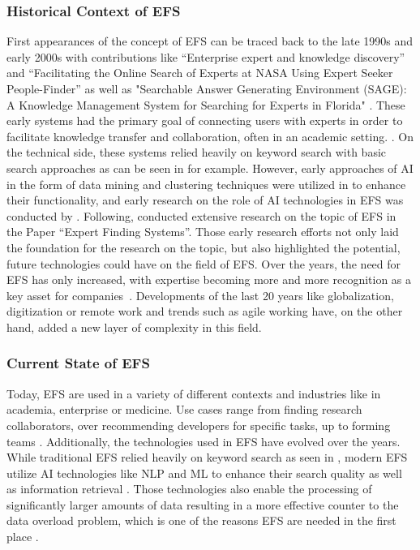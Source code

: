\subsubsection{Historical Context of \ac{EFS}}
First appearances of the concept of \ac{EFS} can be traced back to the late 1990s and early 2000s with contributions like “Enterprise expert and knowledge discovery” \parencite{mattox_enterprise_1999} and “Facilitating the Online Search of Experts at NASA Using Expert Seeker People-Finder” \parencite{becerra-fernandez_facilitating_2000} as well as "Searchable Answer Generating Environment (SAGE): A Knowledge Management System for Searching for Experts in Florida" \parencite{becerra-fernandez_searchable_1999}. These early systems had the primary goal of connecting users with experts in order to facilitate knowledge transfer and collaboration, often in an academic setting. \parencite[1]{mattox_enterprise_1999} \parencite[3-3]{becerra-fernandez_facilitating_2000} \parencite[3]{becerra-fernandez_searchable_1999}. On the technical side, these systems relied heavily on keyword search with basic search approaches as can be seen in \textcite[4-5]{mattox_enterprise_1999} for example. However, early approaches of \ac{AI} in the form of data mining and clustering techniques were utilized in \textcite[3-1]{becerra-fernandez_facilitating_2000} to enhance their functionality, and early research on the role of \ac{AI} technologies in \ac{EFS} was conducted by \textcite{becerra-fernandez_role_2000}. Following, \textcite{maybury_expert_2006} conducted extensive research on the topic of \ac{EFS} in the Paper “Expert Finding Systems”. Those early research efforts not only laid the foundation for the research on the topic, but also highlighted the potential, future technologies could have on the field of \ac{EFS}. Over the years, the need for \ac{EFS} has only increased, with expertise becoming more and more recognition as a key asset for companies \parencite[1]{husain_expert_2019}. Developments of the last 20 years like globalization, digitization or remote work and trends such as agile working have, on the other hand, added a new layer of complexity in this field. 

\subsubsection{Current State of \ac{EFS}}
Today, \ac{EFS} are used in a variety of different contexts and industries like in academia, enterprise or medicine. Use cases range from finding research collaborators, over recommending developers for specific tasks, up to forming teams \parencite[2,9]{husain_expert_2019}. Additionally, the technologies used in \ac{EFS} have evolved over the years. While traditional \ac{EFS} relied heavily on keyword search as seen in \textcite[4-5]{mattox_enterprise_1999}, modern \ac{EFS} utilize \ac{AI} technologies like \ac{NLP} and \ac{ML} to enhance their search quality as well as information retrieval \parencite[19-20]{husain_expert_2019}. Those technologies also enable the processing of significantly larger amounts of data resulting in a more effective counter to the data overload problem, which is one of the reasons \ac{EFS} are needed in the first place \parencite[1]{husain_expert_2019}.

